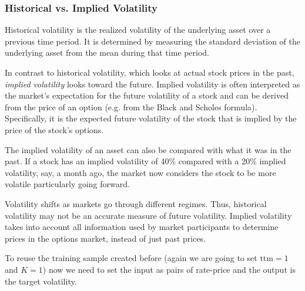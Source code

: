 \begin{attention}
\subsubsection{Historical vs. Implied Volatility}
\label{historical-vs.-implied-volatility}

Historical volatility is the realized volatility of the underlying asset over a previous time period. It is determined by measuring the standard deviation of the underlying asset from the mean during that time period.

In contrast to historical volatility, which looks at actual stock prices in the past, \emph{implied volatility} looks toward the future. Implied volatility is often interpreted as the market's expectation for the future volatility of a stock and can be derived from the price of an option (e.g. from the Black and Scholes formula).
Specifically, it is the expected future volatility of the stock that is implied by the price of the stock's options.

The implied volatility of an asset can also be compared with what it was in the past. If a stock has an implied volatility of 40\% compared with a 20\% implied volatility, say, a month ago, the market now considers the stock to be more volatile particularly going forward.

Volatility shifts as markets go through different regimes. Thus, historical volatility may not be an accurate measure of future volatility. Implied volatility takes into account all information used by market participants to 
determine prices in the options market, instead of just past prices.

\end{attention}

To reuse the training sample created before (again we
are going to set \(\mathrm{ttm}=1\) and \(K=1\)) now we need to set the input as pairs of rate-price and the
output is the target volatility.

